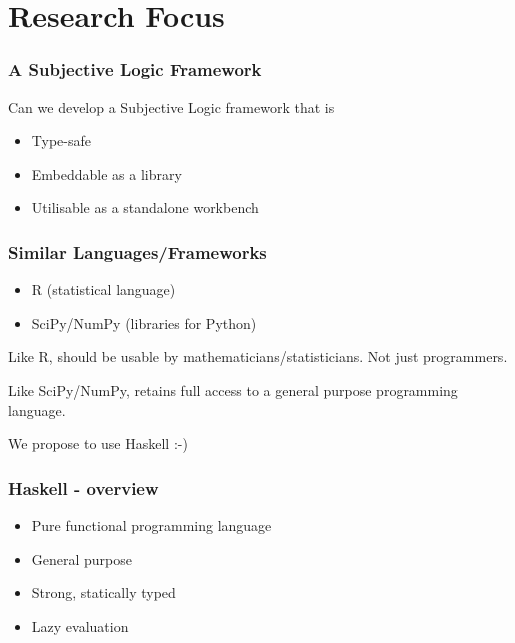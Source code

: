 \documentclass{beamer}
\begin{document}

\section{Research Focus}

\begin{frame}
\frametitle{A Subjective Logic Framework}

Can we develop a Subjective Logic framework that is

\begin{itemize}
  \item Type-safe
  \item Embeddable as a library
  \item Utilisable as a standalone workbench
\end{itemize}

\end{frame}

\begin{frame}
\frametitle{Similar Languages/Frameworks}

\begin{itemize}
  \item R (statistical language)
  \item SciPy/NumPy (libraries for Python)
\end{itemize}

\pause

Like R, should be usable by mathematicians/statisticians. Not just programmers.

\pause

Like SciPy/NumPy, retains full access to a general purpose programming language.

\pause

We propose to use Haskell :-)

\end{frame}

\begin{frame}
\frametitle{Haskell - overview}

\begin{itemize}
  \item Pure functional programming language
  \item General purpose
  \item Strong, statically typed
  \item Lazy evaluation
\end{itemize}

\end{frame}
\end{document}
